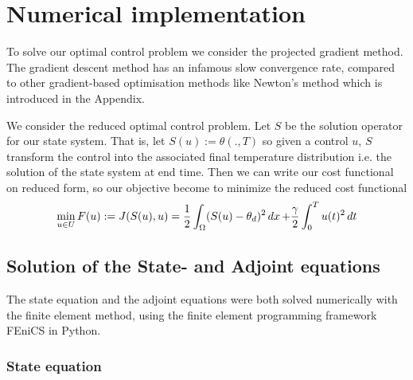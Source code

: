 
\section{Numerical implementation}

To solve our optimal control problem we consider the projected gradient method. The gradient descent method has an infamous slow convergence rate, compared to other gradient-based optimisation methods like Newton's method which is introduced in the Appendix.

We consider the reduced optimal control problem. Let $S$ be the solution operator for our state system. That is, let $S(u):=\theta(.,T)$ so given a control $u$, $S$ transform the control into the associated final temperature distribution i.e. the solution of the state system at end time. Then we can write our cost functional on reduced form, so our objective become to minimize the reduced cost functional 
\begin{equation}
\label{eq:optimization_prob}
    \min_{u \in U}F(u) := J(S(u),u) = \frac{1}{2}\int_{\Omega}(S(u) - \theta_d)^2 \mathop{dx}+ \frac{\gamma}{2}\int_0^Tu(t)^2\mathop{dt}
\end{equation}

\subsection{Solution of the State- and Adjoint equations}

The state equation and the adjoint equations were both solved numerically with the finite element method, using the finite element programming framework FEniCS \cite{fenics} in Python.


\subsubsection{State equation}

